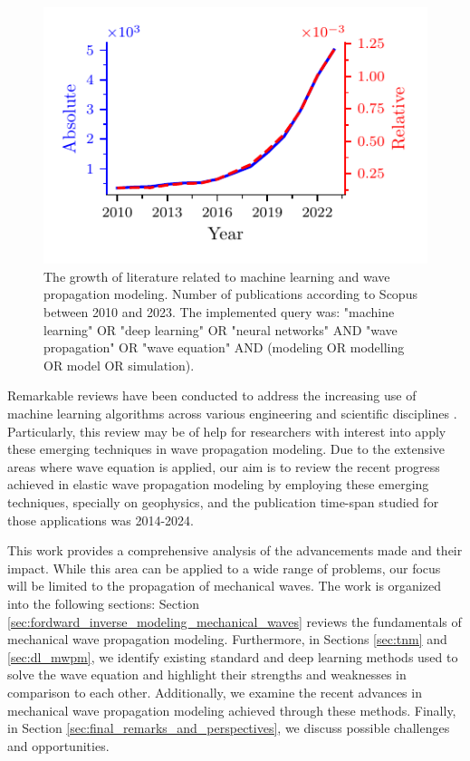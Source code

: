 \documentclass[11pt,twoside]{article}
\begin{document}
\begin{figure}[H]
\centering
    \includegraphics[scale=1]{figs/publications_absolute_relative.pdf}
    \caption{The growth of literature related to machine learning and wave propagation modeling. Number of publications according 
    to Scopus between 2010 and 2023. The implemented query was: "machine learning" OR "deep learning" OR "neural networks" AND 
    "wave propagation" OR "wave equation" AND (modeling OR modelling OR model OR simulation).}
    \label{dl-wave_propagation-publications}
\end{figure}

Remarkable reviews have been conducted to address the increasing use of machine learning algorithms across various engineering and scientific 
disciplines \citep{vadyala_review_2022,deng_physics-informed_2023,lino_current_2023}. Particularly, this review may be of help for 
researchers with interest into apply these emerging techniques in wave propagation modeling. Due to the extensive areas where wave equation 
is applied, our aim is to review the recent progress achieved in elastic wave propagation modeling by employing these emerging techniques, 
specially on geophysics, and the publication time-span studied for those applications was 2014-2024.

This work provides a comprehensive analysis of the advancements made and their impact. While this area can be applied to a wide range of 
problems, our focus will be limited to the propagation of mechanical waves. The work is organized into the following sections: 
Section \ref{sec:fordward_inverse_modeling_mechanical_waves} reviews the fundamentals of mechanical wave propagation modeling. 
Furthermore, in Sections \ref{sec:tnm} and \ref{sec:dl_mwpm}, we identify existing standard and deep learning methods used to solve 
the wave equation and highlight their strengths and weaknesses in comparison to each other. Additionally, we examine the recent 
advances in mechanical wave propagation modeling achieved through these methods. Finally, in Section 
\ref{sec:final_remarks_and_perspectives}, we discuss possible challenges and opportunities.
\end{document}
